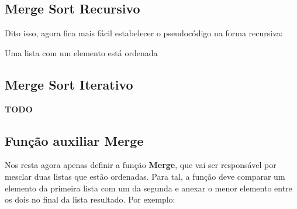 \subsection{Merge Sort Recursivo}

Dito isso, agora fica mais fácil estabelecer o pseudocódigo na forma recursiva:

\begin{algorithm}
	\label{algo:merge_sort_pseudo}
	\begin{algorithmic}[1]
		\Statex
		 \Comment Uma lista com um elemento está ordenada
		\State \Return
		\EndIf
		\EndFunction
	\end{algorithmic}
\end{algorithm}

\subsection{Merge Sort Iterativo}

\textbf{TODO}

\subsection{Função auxiliar Merge}

\noindent
Nos resta agora apenas definir a função \textbf{Merge}, que vai ser responsável por mesclar duas listas que estão ordenadas. Para tal, a função deve comparar um elemento da primeira lista com um da segunda e anexar o menor elemento entre os dois no final da lista resultado. Por exemplo:

